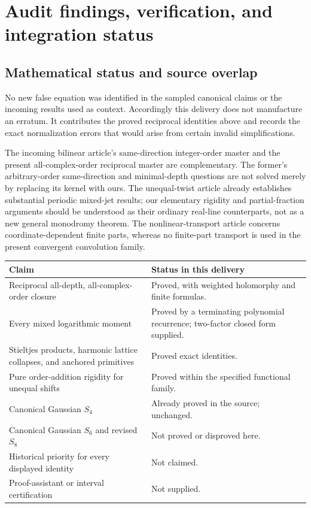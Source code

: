 \section{Audit findings, verification, and integration status}
\label{rlc:sec:audit}

\subsection{Mathematical status and source overlap}
No new false equation was identified in the sampled canonical claims or
the incoming results used as context. Accordingly this delivery does
not manufacture an erratum. It contributes the proved reciprocal
identities above and records the exact normalization errors that would
arise from certain invalid simplifications.

The incoming bilinear article's same-direction integer-order master
\cite{BMH} and the present all-complex-order reciprocal master are
complementary. The former's arbitrary-order same-direction and
minimal-depth questions are not solved merely by replacing its kernel
with ours. The unequal-twist article \cite{UTJ} already establishes
substantial periodic mixed-jet results; our elementary rigidity and
partial-fraction arguments should be understood as their ordinary
real-line counterparts, not as a new general monodromy theorem.
The nonlinear-transport article \cite{NST} concerns coordinate-dependent
finite parts, whereas no finite-part transport is used in the present
convergent convolution family.

\begin{center}
\begin{tabular}{@{}p{}p{}@{}}
\toprule
Claim & Status in this delivery\\
\midrule
Reciprocal all-depth, all-complex-order closure & Proved, with weighted
holomorphy and finite formulas.\\[3pt]
Every mixed logarithmic moment & Proved by a terminating polynomial
recurrence; two-factor closed form supplied.\\[3pt]
Stieltjes products, harmonic lattice collapses, and anchored primitives
& Proved exact identities.\\[3pt]
Pure order-addition rigidity for unequal shifts & Proved within the
specified functional family.\\[3pt]
Canonical Gaussian $S_4$ & Already proved in the source; unchanged.\\[3pt]
Canonical Gaussian $S_6$ and revised $S_8$ & Not proved or disproved here.\\[3pt]
Historical priority for every displayed identity & Not claimed.\\[3pt]
Proof-assistant or interval certification & Not supplied.\\
\bottomrule
\end{tabular}
\end{center}

